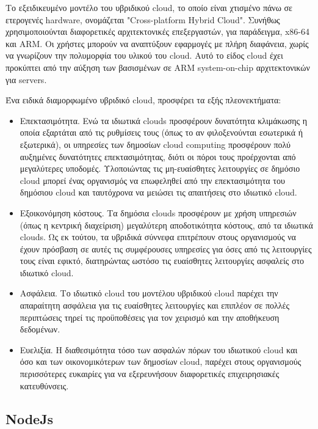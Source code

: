 		Το εξειδικευμένο μοντέλο του υβριδικού cloud, το οποίο είναι χτισμένο πάνω σε ετερογενές hardware, ονομάζεται "Cross-platform Hybrid Cloud". Συνήθως χρησιμοποιούνται διαφορετικές αρχιτεκτονικές επεξεργαστών, για παράδειγμα, x86-64 και ARM. Οι χρήστες μπορούν να αναπτύξουν εφαρμογές με πλήρη διαφάνεια, χωρίς να γνωρίζουν την πολυμορφία του υλικού του cloud. Αυτό το είδος cloud έχει προκύπτει από την αύξηση των βασισμένων σε ARM system-on-chip αρχιτεκτονικών για servers.
		
		Ένα ειδικά διαμορφωμένο υβριδικό cloud, προσφέρει τα εξής πλεονεκτήματα:
		
		\begin{itemize}

		\item Επεκτασιμότητα. Ενώ τα ιδιωτικά clouds προσφέρουν δυνατότητα κλιμάκωσης η οποία εξαρτάται από τις ρυθμίσεις τους (όπως το αν φιλοξενούνται εσωτερικά ή εξωτερικά), οι υπηρεσίες των δημοσίων cloud computing προσφέρουν πολύ αυξημένες δυνατότητες επεκτασιμότητας, διότι οι πόροι τους προέρχονται από μεγαλύτερες υποδομές. Υλοποιώντας τις μη-ευαίσθητες λειτουργίες σε δημόσιο cloud μπορεί ένας οργανισμός να επωφεληθεί από την επεκτασιμότητα του δημόσιου cloud και ταυτόχρονα να μειώσει τις απαιτήσεις στο ιδιωτικό cloud.
		
		\item Εξοικονόμηση κόστους. Τα δημόσια clouds  προσφέρουν με χρήση υπηρεσιών (όπως η κεντρική διαχείριση) μεγαλύτερη αποδοτικότητα κόστους, από  τα ιδιωτικά clouds. Ως εκ τούτου, τα υβριδικά σύννεφα επιτρέπουν στους οργανισμούς να έχουν πρόσβαση σε αυτές τις συμφέρουσες υπηρεσίες για όσες από τις λειτουργίες τους είναι εφικτό, διατηρώντας ωστόσο τις ευαίσθητες λειτουργίες ασφαλείς στο ιδιωτικό cloud.

		\item Ασφάλεια. Το ιδιωτικό cloud του μοντέλου υβριδικού cloud παρέχει την απαραίτητη ασφάλεια για τις ευαίσθητες λειτουργίες και επιπλέον σε πολλές περιπτώσεις τηρεί τις προϋποθέσεις για τον χειρισμό και την αποθήκευση δεδομένων.

		\item Ευελιξία. Η διαθεσιμότητα τόσο των ασφαλών πόρων του ιδιωτικού cloud και όσο και των οικονομικότερων των δημοσίων cloud, παρέχει στους οργανισμούς περισσότερες ευκαιρίες για να εξερευνήσουν διαφορετικές επιχειρησιακές κατευθύνσεις.
		\end{itemize} 

		\subsection{NodeJs}
	
